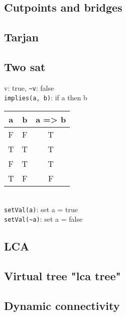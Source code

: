 
\subsection{Cutpoints and bridges }

\subsection{Tarjan }

\subsection{Two sat }

v: true, \lstinline{~v}: false \\

\lstinline{implies(a, b)}: if a then b \\
\begin{tabular}{ |c |c |c|  }
\hline 
a & b &  a => b \\
\hline 
F & F  &   T \\
T & T  &   T \\
F & T   &  T \\
T & F  &   F \\
\hline
\end{tabular} \\

\lstinline{setVal(a)}: set a = true \\
\lstinline{setVal(~a)}: set a = false \\

\subsection{LCA }

\subsection{Virtual tree  "lca tree"}


\subsection{Dynamic connectivity }

